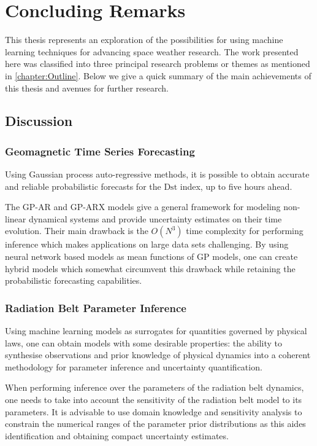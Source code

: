 \chapter{Concluding Remarks}\label{chapter:conclusions}

This thesis represents an exploration of the possibilities for using machine learning techniques 
for advancing space weather research. The work presented here was classified into three principal 
research problems or themes as mentioned in \cref{chapter:Outline}. Below we give a quick summary 
of the main achievements of this thesis and avenues for further research.

\section{Discussion}

\subsection*{Geomagnetic Time Series Forecasting}

Using Gaussian process auto-regressive methods, it is possible to obtain accurate and reliable 
probabilistic forecasts for the $\mathrm{Dst}$ index, up to five hours ahead. 

The GP-AR and GP-ARX models give a general framework for modeling non-linear dynamical systems and 
provide uncertainty estimates on their time evolution. Their main drawback is the $O(N^3)$ time 
complexity for performing inference which makes applications on large data sets challenging. By 
using neural network based models as mean functions of GP models, one can create hybrid models 
which somewhat circumvent this drawback while retaining the probabilistic forecasting capabilities.

\subsection*{Radiation Belt Parameter Inference}

Using machine learning models as surrogates for quantities governed by physical laws, one can 
obtain models with some desirable properties: the ability to synthesise observations and prior 
knowledge of physical dynamics into a coherent methodology for parameter inference and uncertainty 
quantification. 

When performing inference over the parameters of the radiation belt dynamics, one needs to take 
into account the sensitivity of the radiation belt model to its parameters. It is advisable to use 
domain knowledge and sensitivity analysis to constrain the numerical ranges of the parameter 
prior distributions as this aides identification and obtaining compact uncertainty estimates.

